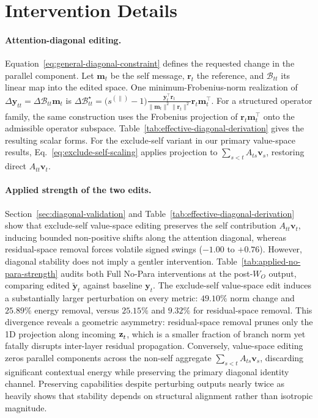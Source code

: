 \section{Intervention Details}
\label{app:method}

\paragraph{Attention-diagonal editing.}
Equation~\ref{eq:general-diagonal-constraint} defines the requested change in
the parallel component. Let $\mathbf m_t$ be the self message,
$\mathbf r_t$ the reference, and $\mathcal B_{tt}$ its linear map into the
edited space. One minimum-Frobenius-norm realization of
$\Delta\mathbf y_{tt}=\Delta\mathcal B_{tt}\mathbf m_t$ is
\(\Delta\mathcal{B}_{tt}^{\star} = \bigl(s^{(\parallel)}-1\bigr)
\frac{\mathbf{y}_t^\top\mathbf{r}_t}{\|\mathbf{m}_t\|^2\|\mathbf{r}_t\|^2}
\mathbf{r}_t\mathbf{m}_t^\top\).
For a structured operator family, the same construction uses the Frobenius
projection of \(\mathbf{r}_t\mathbf{m}_t^\top\) onto the admissible operator
subspace. Table~\ref{tab:effective-diagonal-derivation} gives the resulting scalar forms.
For the exclude-self variant in our primary value-space results,
Eq.~\ref{eq:exclude-self-scaling} applies projection to
\(\sum_{s<t}A_{ts}\mathbf{v}_s\), restoring direct \(A_{tt}\mathbf{v}_t\).

\paragraph{Applied strength of the two edits.}
Section~\ref{sec:diagonal-validation} and Table~\ref{tab:effective-diagonal-derivation}
show that exclude-self value-space editing preserves the self contribution
$A_{tt}\mathbf{v}_t$, inducing bounded non-positive shifts along the attention diagonal,
whereas residual-space removal forces volatile signed swings ($-1.00$ to $+0.76$).
However, diagonal stability does not imply a gentler intervention.
Table~\ref{tab:applied-no-para-strength} audits both Full No-Para interventions at the
post-$W_O$ output, comparing edited $\widetilde{\mathbf{y}}_t$ against baseline $\mathbf{y}_t$.
The exclude-self value-space edit induces a substantially larger perturbation
on every metric: $49.10\%$ norm change and $25.89\%$ energy removal, versus
$25.15\%$ and $9.32\%$ for residual-space removal.
This divergence reveals a geometric asymmetry: residual-space removal
prunes only the 1D projection along incoming $\mathbf{z}^{}_{t}$, which is a smaller fraction of branch
norm yet fatally disrupts inter-layer residual propagation.
Conversely, value-space editing zeros parallel components across the non-self
aggregate $\sum_{s<t} A_{ts}\mathbf{v}_s$, discarding significant contextual energy
while preserving the primary diagonal identity channel.
Preserving capabilities despite perturbing outputs nearly twice as heavily
shows that stability depends on structural alignment rather than isotropic magnitude.

